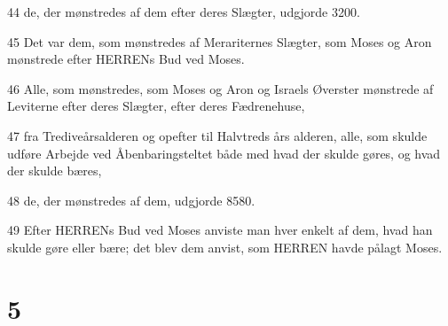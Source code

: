 \par 44 de, der mønstredes af dem efter deres Slægter, udgjorde 3200.
\par 45 Det var dem, som mønstredes af Merariternes Slægter, som Moses og Aron mønstrede efter HERRENs Bud ved Moses.
\par 46 Alle, som mønstredes, som Moses og Aron og Israels Øverster mønstrede af Leviterne efter deres Slægter, efter deres Fædrenehuse,
\par 47 fra Trediveårsalderen og opefter til Halvtreds års alderen, alle, som skulde udføre Arbejde ved Åbenbaringsteltet både med hvad der skulde gøres, og hvad der skulde bæres,
\par 48 de, der mønstredes af dem, udgjorde 8580.
\par 49 Efter HERRENs Bud ved Moses anviste man hver enkelt af dem, hvad han skulde gøre eller bære; det blev dem anvist, som HERREN havde pålagt Moses.

\chapter{5}

